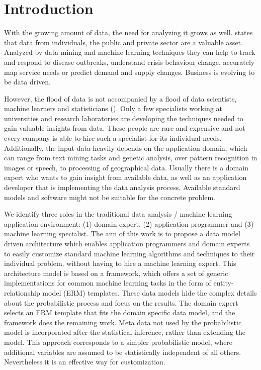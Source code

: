 \section{Introduction}

With the growing amount of data, the need for analyzing it grows as well. \textcite{forum2012bigdata} states that data from individuals, the public and private sector are a valuable asset. Analyzed by data mining and machine learning techniques they can help to track and respond to disease outbreaks, understand crisis behaviour change, accurately map service needs or predict demand and supply changes. Business is evolving to be data driven.

However, the flood of data is not accompanied by a flood of data scientists, machine learners and statisticians (\cite{davenport2012data}). Only a few specialists working at universities and research laboratories are developing the techniques needed to gain valuable insights from data. These people are rare and expensive and not every company is able to hire such a specialist for its individual needs. Additionally, the input data heavily depends on the application domain, which can range from text mining tasks and genetic analysis, over pattern recognition in images or speech, to processing of geographical data. Usually there is a domain expert who wants to gain insight from available data, as well as an application developer that is implementing the data analysis process. Available standard models and software might not be suitable for the concrete problem.

We identify three roles in the traditional data analysis / machine learning application environment: (1) domain expert, (2) application programmer and (3) machine learning specialist. The aim of this work is to propose a data model driven architecture which enables application programmers and domain experts to easily customize standard machine learning algorithms and techniques to their individual problem, without having to hire a machine learning expert. This architecture model is based on a framework, which offers a set of generic implementations for common machine learning tasks in the form of entity-relationship model (ERM) templates. These data models hide the complex details about the probabilistic process and focus on the results. The domain expert selects an ERM template that fits the domain specific data model, and the framework does the remaining work. Meta data not used by the probabilistic model is incorporated after the statistical inference, rather than extending the model. This approach corresponds to a simpler probabilistic model, where additional variables are assumed to be statistically independent of all others. Nevertheless it is an effective way for customization.

